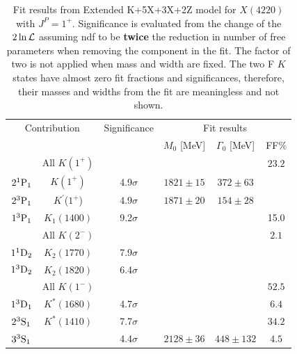 \begin{table}[tbph]
\begin{center}
\caption{Fit results from  Extended K+5X+3X+2Z model for $X(4220)$ with $J^P=1^+$. 
Significance is evaluated from the change of the $2\ln\mathcal{L}$ assuming ndf to be {\bf twice} the reduction in number of free parameters when removing the component in the fit. 
The factor of two is not applied when mass and width are fixed. 
The two F $K$ states have almost zero fit fractions and significances, 
therefore, their masses and widths from the fit are meaningless and not shown. }\label{tab:fitextend}
\begin{tabular}{cccccc}
\hline
\multicolumn{2}{c}{Contribution} &Significance & \multicolumn{3}{c}{Fit results}  \\
                  &                           &                 & $M_0$ [MeV]   & $\Gamma_0$ [MeV]      & FF\%          \\
\hline \hline
  & All $K(1^+)$    &        &    &   &  $23.2$          \\
$2{}^{1}{\rm P}_{1}$   &   $K(1^+)$              & 4.9$\sigma$     &  $1821\pm 15 $   &  $372\pm 63$   &        \\
$2{}^{3}{\rm P}_{1}$   &   $K^{\prime}$($1^+$)   & 4.9$\sigma$    &  $1871\pm 20 $   &  $154\pm 28$   &     \\
$1{}^{3}{\rm P}_{1}$   &   $K_1(1400)$           & 9.2$\sigma$     &   &   &   15.0   \\
\hline
   &     All $K(2^-)$   &        &      & &  $2.1$           \\
$1{}^{1}{\rm D}_{2}$   &  $K_2 (1770)$  & 7.9$\sigma$       &    &     &      \\
$1{}^{3}{\rm D}_{2}$   &  $K_2(1820)$   & 6.4$\sigma$        &    &     &        \\       

\hline
& All $K(1^-)$ & & & & $52.5$ \\
$1{}^{3}{\rm D}_{1}$   & $K^*(1680)$  & 4.7$\sigma$  &    &                           & $6.4$     \\  
$2{}^{3}{\rm S}_{1}$   & $K^*(1410)$  & 7.7$\sigma$   &    &                           & $34.2$ \\
$3{}^{3}{\rm S}_{1}$   &              & 4.4$\sigma$  & $2128\pm36 $   &   $448\pm132$  & $4.5$ \\
\hline


\end{tabular}
\end{center}
\end{table}
